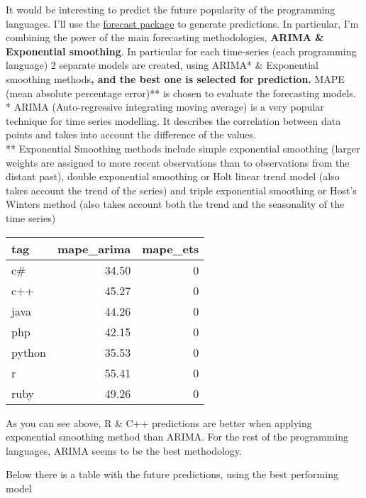 \documentclass[
]{article}
\begin{document}
It would be interesting to predict the future popularity of the
programming languages. I'll use the
\href{https://cran.r-project.org/web/packages/forecast/forecast.pdf}{forecast
package} to generate predictions. In particular, I'm combining the power
of the main forecasting methodologies, \textbf{ARIMA \& Exponential
smoothing}. In particular for each time-series (each programming
language) 2 separate models are created, using ARIMA* \& Exponential
smoothing methods\textbf{, and the best one is selected for prediction.
}MAPE (mean absolute percentage error)** is chosen to evaluate the
forecasting models.\\
* ARIMA (Auto-regressive integrating moving average) is a very popular
technique for time series modelling. It describes the correlation
between data points and takes into account the difference of the
values.\\
** Exponential Smoothing methods include simple exponential smoothing
(larger weights are assigned to more recent observations than to
observations from the distant past), double exponential smoothing or
Holt linear trend model (also takes account the trend of the series) and
triple exponential smoothing or Host's Winters method (also takes
account both the trend and the seasonality of the time series)

\begin{table}
\centering
\begin{tabular}{l|r|r}
\hline
tag & mape\_arima & mape\_ets\\
\hline
c\# & 34.50 & 0\\
\hline
c++ & 45.27 & 0\\
\hline
java & 44.26 & 0\\
\hline
php & 42.15 & 0\\
\hline
python & 35.53 & 0\\
\hline
r & 55.41 & 0\\
\hline
ruby & 49.26 & 0\\
\hline
\end{tabular}
\end{table}

As you can see above, R \& C++ predictions are better when applying
exponential smoothing method than ARIMA. For the rest of the programming
languages, ARIMA seems to be the best methodology.

Below there is a table with the future predictions, using the best
performing model
\end{document}
